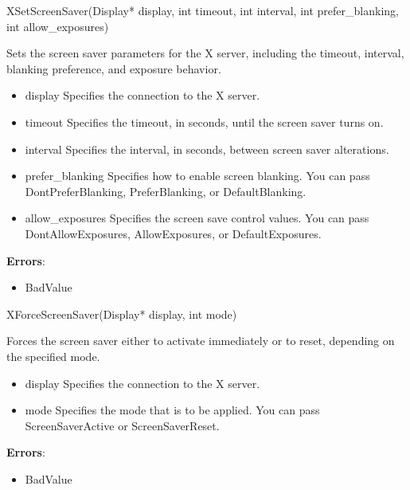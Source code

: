 \documentclass{report}
\begin{document}
\begin{itemize}
        \begin{cppcode}
        XSetScreenSaver(Display* display, int timeout, int interval, int prefer_blanking, int allow_exposures)
        \end{cppcode}
        \bigbreak \noindent
        Sets the screen saver parameters for the X server, including the timeout, interval, blanking preference, and exposure behavior.
        \begin{itemize}
            \item display Specifies the connection to the X server.
            \item timeout Specifies the timeout, in seconds, until the screen saver turns on.
            \item interval Specifies the interval, in seconds, between screen saver alterations.
            \item prefer\_blanking Specifies how to enable screen blanking. You can pass DontPreferBlanking, PreferBlanking, or DefaultBlanking.
            \item allow\_exposures Specifies the screen save control values. You can pass DontAllowExposures, AllowExposures, or DefaultExposures.
        \end{itemize}
        \bigbreak \noindent
        \textbf{Errors}:
        \begin{itemize}
            \item BadValue
        \end{itemize}

        \begin{cppcode}
        XForceScreenSaver(Display* display, int mode)
        \end{cppcode}
        \bigbreak \noindent
        Forces the screen saver either to activate immediately or to reset, depending on the specified mode.
        \begin{itemize}
            \item display Specifies the connection to the X server.
            \item mode Specifies the mode that is to be applied. You can pass ScreenSaverActive or ScreenSaverReset.
        \end{itemize}
        \bigbreak \noindent
        \textbf{Errors}:
        \begin{itemize}
            \item BadValue
        \end{itemize}


\end{itemize}
\end{document}
